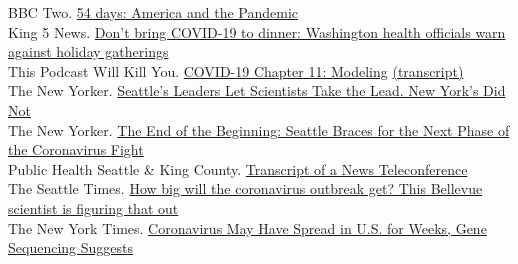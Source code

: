 \documentclass{article}
\begin{document}
\begin{llist}
{BBC Two. \href{https://www.bbc.co.uk/iplayer/episode/m000ry3q/54-days-series-1-2-america-and-the-pandemic}{54 days: America and the Pandemic} }\\
{King 5 News.  \href{https://www.king5.com/article/news/health/coronavirus/washington-state-health-warning-against-thanksgiving-gatherings-covid-19-coronavirus-pandemic/281-43867ff1-422c-45d8-a45e-6c95ecefc909}{Don't bring COVID-19 to dinner: Washington health officials warn against holiday gatherings} }\\
{This Podcast Will Kill You. \href{https://thispodcastwillkillyou.com/2020/05/04/covid-19-chapter-11-modeling/}{COVID-19 Chapter 11: Modeling} \href{http://thispodcastwillkillyou.com/wp-content/uploads/2021/04/TPWKY-COVID-11-Modeling.pdf}{(transcript)} }\\
{The New Yorker. \href{https://www.newyorker.com/magazine/2020/05/04/seattles-leaders-let-scientists-take-the-lead-new-yorks-did-not}{Seattle’s Leaders Let Scientists Take the Lead. New York’s Did Not} }\\
{The New Yorker. \href{https://www.newyorker.com/news/dispatch/the-end-of-the-beginning-seattle-braces-for-the-next-phase-of-the-coronavirus-fight}{The End of the Beginning: Seattle Braces for the Next Phase of the Coronavirus Fight} }\\
{Public Health Seattle \& King County. \href{https://kingcounty.gov/depts/health/news/2020/April/~/media/depts/health/news/documents/15-covid-teleconference-transcript.ashx}{Transcript of a News Teleconference}}\\
{The Seattle Times. \href{https://www.seattletimes.com/seattle-news/how-big-will-the-coronavirus-outbreak-get-this-bellevue-scientist-is-figuring-that-out/}{How big will the coronavirus outbreak get? This Bellevue scientist is figuring that out} }\\
{The New York Times. \href{https://www.nytimes.com/2020/03/01/health/coronavirus-washington-spread.html}{Coronavirus May Have Spread in U.S. for Weeks, Gene Sequencing Suggests} }



 \vspace{4pt}


\end{llist}
\end{document}
